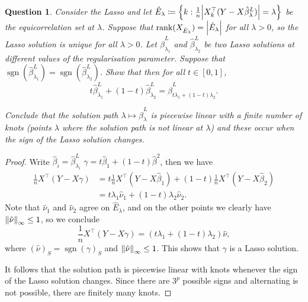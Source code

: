 \documentclass{article}
\theoremstyle{plain}
\newtheorem{question}{Question}
\theoremstyle{remark}
\newcommand{\T}{^\top} %
\newcommand\ceq\coloneqq %
\DeclareMathOperator{\sign}{sgn}
\begin{document}
\begin{question}
	Consider the Lasso and let $\hat E_\lambda \ceq \qty{k : \frac1n \abs{X_k\T (Y - X\hat\beta_\lambda^L)} = \lambda}$ be the equicorrelation set at $\lambda$. Suppose that $\rank(X_{\hat E_\lambda}) = \abs{\hat E_\lambda}$ for all $\lambda > 0$, so the Lasso solution is unique for all $\lambda > 0$. Let $\hat\beta_{\lambda_1}^L$ and $\hat\beta_{\lambda_2}^L$ be two Lasso solutions at different values of the regularisation parameter. Suppose that $\sign(\hat\beta_{\lambda_1}^L) = \sign(\hat\beta_{\lambda_2}^L)$. Show that then for all $t \in [0, 1]$,
	\[
	t \hat \beta_{\lambda_1}^L + (1-t) \hat\beta_{\lambda_2}^L = \hat\beta_{t \lambda_1 + (1-t)\lambda_2}^L.
	\]
	
	Conclude that the solution path $\lambda \mapsto \hat\beta_\lambda^L$ is piecewise linear with a finite number of knots (points $\lambda$ where the solution path is not linear at $\lambda$) and these occur when the sign of the Lasso solution changes. 
\end{question}

\begin{proof}
	Write $\hat\beta_i = \hat\beta^L_{\lambda_i}$ $\gamma = t \hat\beta_{1} + (1-t) \hat\beta^{2}$, then we have
	\begin{align*}
	\frac1n X\T(Y - X\gamma) &= t \frac1n X\T(Y - X\hat\beta_1) + (1-t) \frac1n X\T (Y - X\hat\beta_2) \\
	&= t \lambda_1 \hat \nu_1 + (1-t)\lambda_2 \hat\nu_2. 
	\end{align*}
	Note that $\hat\nu_1$ and $\hat\nu_2$ agree on $\hat E_\lambda$, and on the other points we clearly have $\norm{\hat\nu}_\infty \leq 1$, so we conclude
	\[
	\frac1n X\T (Y - X\gamma) = (t\lambda_1 + (1-t)\lambda_2) \hat\nu, 
	\]
	where $(\hat\nu)_S = \sign(\gamma)_S$ and $\norm{\hat\nu}_\infty \leq 1$. This shows that $\gamma$ is a Lasso solution.
	
	It follows that the solution path is piecewise linear with knots whenever the sign of the Lasso solution changes. Since there are $3^p$ possible signs and alternating is not possible, there are finitely many knots. 
\end{proof}
\end{document}
